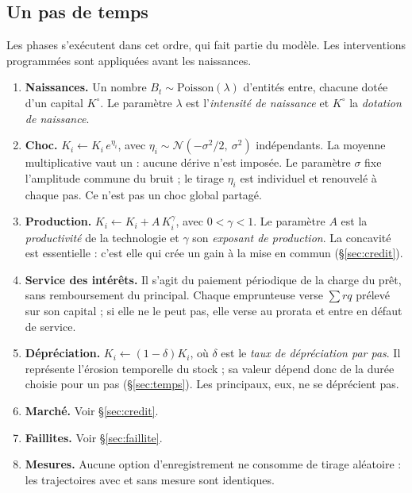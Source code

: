 \subsection{Un pas de temps}\label{sec:pas}

Les phases s'exécutent dans cet ordre, qui fait partie du modèle.
Les interventions programmées sont appliquées avant les naissances.

\begin{enumerate}[label=(\roman*),leftmargin=2.2em]
\item \textbf{Naissances.} Un nombre $B_t \sim \mathrm{Poisson}(\lambda)$
  d'entités entre, chacune dotée d'un capital $K^\circ$. Le paramètre $\lambda$ est
  l'\emph{intensité de naissance} et $K^\circ$ la \emph{dotation de naissance}.
\item \textbf{Choc.} $K_i \leftarrow K_i \, e^{\eta_i}$, avec
  $\eta_i \sim \mathcal{N}(-\sigma^2/2,\ \sigma^2)$ indépendants. La moyenne
  multiplicative vaut un : aucune dérive n'est imposée. Le paramètre $\sigma$
  fixe l'amplitude commune du bruit ; le tirage $\eta_i$ est individuel et
  renouvelé à chaque pas. Ce n'est pas un choc global partagé.
\item \textbf{Production.} $K_i \leftarrow K_i + A\,K_i^{\gamma}$, avec
  $0<\gamma<1$. Le paramètre $A$ est la \emph{productivité} de la technologie
  et $\gamma$ son \emph{exposant de production}. La concavité est essentielle :
  c'est elle qui crée un gain à la mise en commun (§\ref{sec:credit}).
\item \textbf{Service des intérêts.} Il s'agit du paiement périodique de la
  charge du prêt, sans remboursement du principal. Chaque emprunteuse verse $\sum r q$ prélevé sur son
  capital ; si elle ne le peut pas, elle verse au prorata et entre en défaut de
  service.
\item \textbf{Dépréciation.} $K_i \leftarrow (1-\delta)K_i$, où $\delta$ est le
  \emph{taux de dépréciation par pas}. Il représente l'érosion temporelle
  du stock ; sa valeur dépend donc de la durée choisie pour un pas
  (§\ref{sec:temps}). Les principaux, eux, ne se déprécient pas.
\item \textbf{Marché.} Voir §\ref{sec:credit}.
\item \textbf{Faillites.} Voir §\ref{sec:faillite}.
\item \textbf{Mesures.} Aucune option d'enregistrement ne consomme de tirage
  aléatoire : les trajectoires avec et sans mesure sont identiques.
\end{enumerate}

